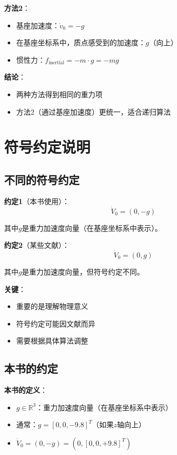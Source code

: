 \documentclass[12pt,a4paper]{article}
\begin{document}
\textbf{方法2}：
\begin{itemize}
\item 基座加速度：$\dot{v}_0 = -g$
\item 在基座坐标系中，质点感受到的加速度：$g$（向上）
\item 惯性力：$f_{\text{inertial}} = -m \cdot g = -mg$
\end{itemize}

\textbf{结论}：
\begin{itemize}
\item 两种方法得到相同的重力项
\item 方法2（通过基座加速度）更统一，适合递归算法
\end{itemize}

\section{符号约定说明}

\subsection{不同的符号约定}

\textbf{约定1}（本书使用）：
\begin{equation}
\dot{V}_0 = (0, -g)
\end{equation}

其中$g$是重力加速度向量（在基座坐标系中表示）。

\textbf{约定2}（某些文献）：
\begin{equation}
\dot{V}_0 = (0, g)
\end{equation}

其中$g$是重力加速度向量，但符号约定不同。

\textbf{关键}：
\begin{itemize}
\item 重要的是理解物理意义
\item 符号约定可能因文献而异
\item 需要根据具体算法调整
\end{itemize}

\subsection{本书的约定}

\textbf{本书的定义}：
\begin{itemize}
\item $g \in \mathbb{R}^3$：重力加速度向量（在基座坐标系中表示）
\item 通常：$g = [0, 0, -9.8]^T$（如果$z$轴向上）
\item $\dot{V}_0 = (0, -g) = (0, [0, 0, +9.8]^T)$
\end{itemize}
\end{document}
